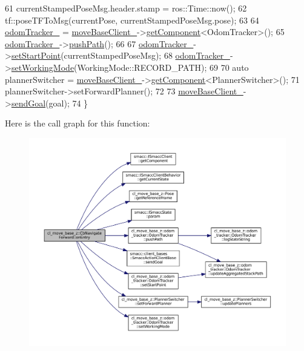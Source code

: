\begin{DoxyCode}
61   currentStampedPoseMsg.header.stamp = ros::Time::now();
62   tf::poseTFToMsg(currentPose, currentStampedPoseMsg.pose);
63 
64   \hyperlink{classcl__move__base__z_1_1CbNavigateForward_a7583a4d669af48618bd45950db8e5292}{odomTracker\_} = \hyperlink{classcl__move__base__z_1_1CbMoveBaseClientBehaviorBase_ab2ef219464cfac8659b4a87c8d0db6d5}{moveBaseClient\_}->\hyperlink{classsmacc_1_1ISmaccClient_adef78db601749ca63c19e74a27cb88cc}{getComponent}<OdomTracker>();
65   \hyperlink{classcl__move__base__z_1_1CbNavigateForward_a7583a4d669af48618bd45950db8e5292}{odomTracker\_}->\hyperlink{classcl__move__base__z_1_1odom__tracker_1_1OdomTracker_a205ee48ec8b4599658e7408fc4755239}{pushPath}();
66 
67   \hyperlink{classcl__move__base__z_1_1CbNavigateForward_a7583a4d669af48618bd45950db8e5292}{odomTracker\_}->\hyperlink{classcl__move__base__z_1_1odom__tracker_1_1OdomTracker_a9f4989c6353022c2ec3b0546c09bf3bc}{setStartPoint}(currentStampedPoseMsg);
68   \hyperlink{classcl__move__base__z_1_1CbNavigateForward_a7583a4d669af48618bd45950db8e5292}{odomTracker\_}->\hyperlink{classcl__move__base__z_1_1odom__tracker_1_1OdomTracker_aeed01bdefd9a1cc709b0b3e4eed285ed}{setWorkingMode}(WorkingMode::RECORD\_PATH);
69 
70   \textcolor{keyword}{auto} plannerSwitcher = \hyperlink{classcl__move__base__z_1_1CbMoveBaseClientBehaviorBase_ab2ef219464cfac8659b4a87c8d0db6d5}{moveBaseClient\_}->\hyperlink{classsmacc_1_1ISmaccClient_adef78db601749ca63c19e74a27cb88cc}{getComponent}<PlannerSwitcher>();
71   plannerSwitcher->setForwardPlanner();
72 
73   \hyperlink{classcl__move__base__z_1_1CbMoveBaseClientBehaviorBase_ab2ef219464cfac8659b4a87c8d0db6d5}{moveBaseClient\_}->\hyperlink{classsmacc_1_1client__bases_1_1SmaccActionClientBase_a9c47a5094ac8afb01680307fe5eca922}{sendGoal}(goal);
74 \}
\end{DoxyCode}
Here is the call graph for this function\+:
\nopagebreak
\begin{figure}[H]
\begin{center}
\leavevmode
\includegraphics[width=350pt]{classcl__move__base__z_1_1CbNavigateForward_af9a2e49071de287922c3f5963a079b95_cgraph}
\end{center}
\end{figure}
